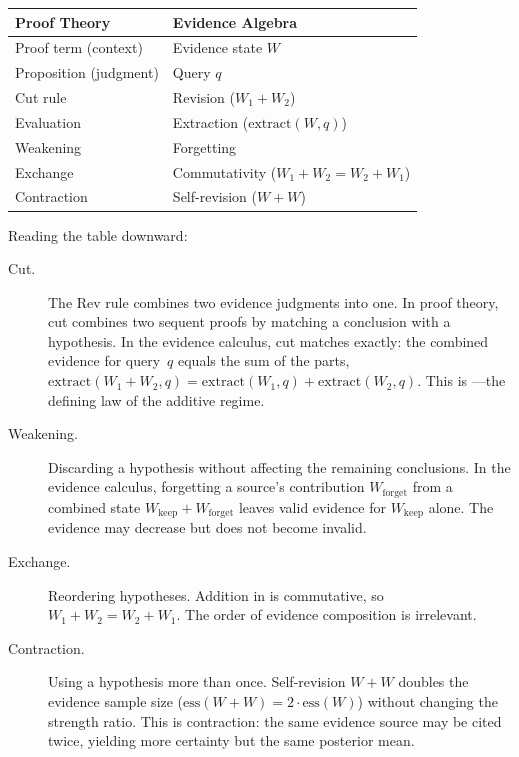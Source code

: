 \documentclass[11pt,openany]{report}
\begin{document}
\medskip
\begin{center}
\begin{tabular}{ll}
\toprule
\textbf{Proof Theory}   & \textbf{Evidence Algebra} \\
\midrule
Proof term (context)     & Evidence state $W$ \\
Proposition (judgment)   & Query $q$ \\
Cut rule                 & Revision ($W_1 + W_2$) \\
Evaluation               & Extraction ($\mathrm{extract}(W, q)$) \\
Weakening                & Forgetting \\
Exchange                 & Commutativity ($W_1 + W_2 = W_2 + W_1$) \\
Contraction              & Self-revision ($W + W$) \\
\bottomrule
\end{tabular}
\end{center}
\medskip

\noindent
Reading the table downward:

\begin{description}
\item[Cut.]  The Rev rule combines two evidence judgments into one.
  In proof theory, cut combines two sequent proofs by matching a
  conclusion with a hypothesis.  In the evidence calculus, cut
  matches exactly: the combined evidence for query~$q$ equals the
  sum of the parts, $\mathrm{extract}(W_1 + W_2, q) =
  \mathrm{extract}(W_1, q) + \mathrm{extract}(W_2, q)$.  This is
  ---the defining law of the additive regime.

\item[Weakening.]  Discarding a hypothesis without affecting the
  remaining conclusions.  In the evidence calculus, forgetting a
  source's contribution $W_{\mathrm{forget}}$ from a combined state
  $W_{\mathrm{keep}} + W_{\mathrm{forget}}$ leaves valid evidence
  for $W_{\mathrm{keep}}$ alone.  The evidence may decrease but does
  not become invalid.

\item[Exchange.]  Reordering hypotheses.  Addition in
   is commutative, so
  $W_1 + W_2 = W_2 + W_1$.  The order of evidence composition
  is irrelevant.

\item[Contraction.]  Using a hypothesis more than once.
  Self-revision $W + W$ doubles the evidence sample size
  ($\mathrm{ess}(W + W) = 2 \cdot \mathrm{ess}(W)$) without
  changing the strength ratio.  This is contraction: the same
  evidence source may be cited twice, yielding more certainty
  but the same posterior mean.
\end{description}
\end{document}
